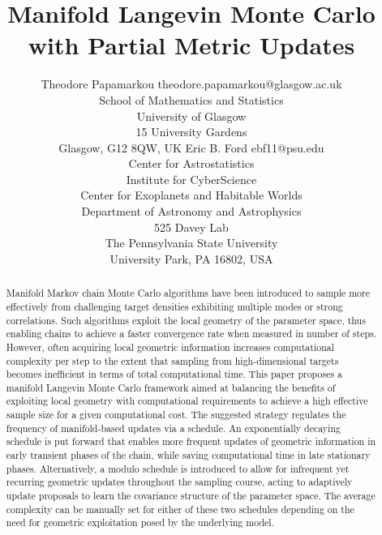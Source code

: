\documentclass[twoside,11pt]{article}
\begin{document}
\title{Manifold Langevin Monte Carlo with Partial Metric Updates}

\author{
  \name Theodore Papamarkou
  \email theodore.papamarkou@glasgow.ac.uk\\
  \addr 
    School of Mathematics and Statistics\\
    University of Glasgow\\
    15 University Gardens\\
    Glasgow, G12 8QW, UK
\AND
  \name Eric B. Ford
  \email ebf11@psu.edu\\
  \addr
    Center for Astrostatistics\\
    Institute for CyberScience\\
    Center for Exoplanets and Habitable Worlds\\
    Department of Astronomy and Astrophysics\\
    525 Davey Lab\\
    The Pennsylvania State University\\
    University Park, PA 16802, USA
}


\maketitle

\begin{abstract}%
Manifold Markov chain Monte Carlo algorithms have been introduced to sample more effectively from challenging target 
densities exhibiting multiple modes or strong correlations. Such algorithms exploit the local geometry of the parameter 
space, thus enabling chains to achieve a faster convergence rate when measured in number of steps. However, often acquiring 
local geometric information increases computational complexity per step to the extent that sampling from high-dimensional 
targets becomes inefficient in terms of total computational time. This paper proposes a manifold Langevin Monte Carlo 
framework aimed at balancing the benefits of exploiting local geometry with computational requirements to achieve a high 
effective sample size for a given computational cost. The suggested strategy regulates the frequency of manifold-based 
updates via a schedule. An exponentially decaying schedule is put forward that enables more frequent updates of geometric 
information in early transient phases of the chain, while saving computational time in late stationary phases. 
Alternatively, a modulo schedule is introduced to allow for infrequent yet recurring geometric updates throughout the 
sampling course, acting to adaptively update proposals to learn the covariance structure of the parameter space. The average 
complexity can be manually set for either of these two schedules depending on the need for geometric exploitation posed by 
the underlying model.  
\end{abstract}
\end{document}
